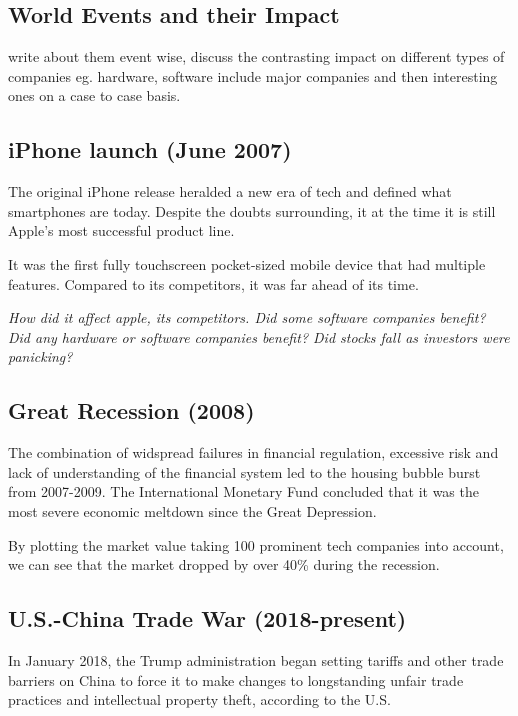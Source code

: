 \documentclass[11pt, twocolumn]{article}
\begin{document}
\begin{justify}
\section{\large World Events and their Impact}
\vspace{-5pt}

write about them event wise, discuss the contrasting impact on different types of companies eg. hardware, software
include major companies and then interesting ones on a case to case basis.

\subsection{iPhone launch (June 2007)}
The original iPhone release heralded a new era of tech and defined what smartphones are today. Despite the 
doubts surrounding, it at the time it is still Apple's most successful product line.

\vspace{1em}
It was the first fully touchscreen pocket-sized mobile device that had multiple features. Compared to its
competitors, it was far ahead of its time.

\vspace{1em}
\textit{
How did it affect apple, its competitors. Did some software companies benefit?
Did any hardware or software companies benefit? Did stocks fall as investors were panicking?}
\vspace{-5pt}

\subsection{Great Recession (2008)}
The combination of widspread failures in financial regulation, excessive risk and lack of understanding of the financial system led to the housing bubble burst from 2007-2009.
The International Monetary Fund concluded that it was the most severe economic meltdown since the Great Depression.
\vspace{1em}


By plotting the market value taking 100 prominent tech companies into account, we can see that the market dropped by over
40\% during the recession.

\vspace{-5pt}

\subsection{U.S.-China Trade War (2018-present)}
In January 2018, the Trump administration began setting tariffs and other trade barriers on China to force it to make changes to longstanding unfair trade practices and intellectual property theft, according to the U.S. \vspace{1em}



\end{justify}
\end{document}

